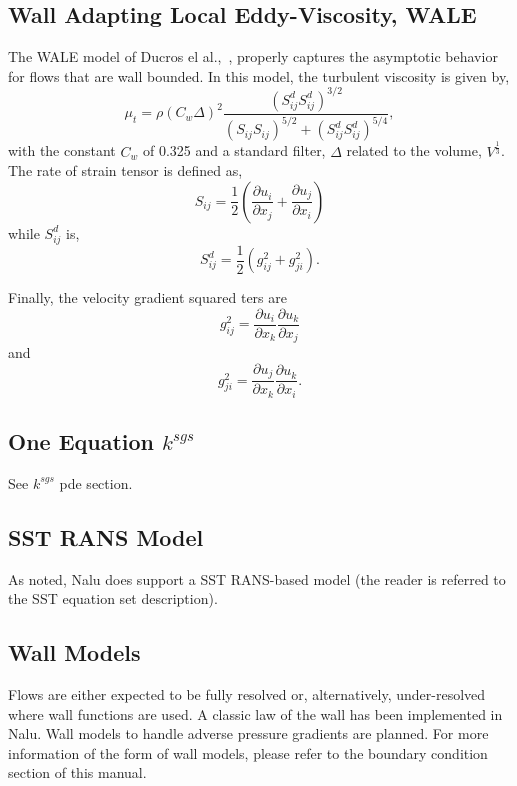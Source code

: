 \subsection{Wall Adapting Local Eddy-Viscosity, WALE}

The WALE model of Ducros el al.,~\cite{Ducros:1998}, properly captures the asymptotic
behavior for flows that are wall bounded. In this model, the turbulent viscosity is
given by,
%
\begin{equation}
\mu_t = \rho \left(C_w \Delta \right)^2 \frac{\left( S^d_{ij}S^d_{ij}\right)^{3/2}}{\left( S_{ij}S_{ij}\right)^{5/2} + \left( S^d_{ij}S^d_{ij}\right)^{5/4}},
\label{mut-wale}
\end{equation}
%
with the constant $C_w$ of 0.325 and a standard filter, $\Delta$ related to the volume, $V^{\frac{1}{3}}$. 
The rate of strain tensor is defined as,
\begin{equation}
S_{ij} = \frac{1}{2} \left( \frac{\partial u_i}{\partial x_j} + \frac{\partial u_j}{\partial x_i} \right)
\label{wale-sij}
\end{equation}
while $S^d_{ij}$ is,
\begin{equation}
 S^d_{ij} = \frac{1}{2} \left( g^2_{ij} + g^2_{ji}\right).
\label{wale-sij}
\end{equation}

Finally, the velocity gradient squared ters are
\begin{equation}
 g^2_{ij} = \frac{\partial u_i}{\partial x_k} \frac{\partial u_k}{\partial x_j}
\label{wale-sqij}
\end{equation}
and
\begin{equation}
 g^2_{ji} = \frac{\partial u_j}{\partial x_k} \frac{\partial u_k}{\partial x_i}.
\label{wale-gsqji}
\end{equation}

\subsection{One Equation $k^{sgs}$}
See $k^{sgs}$ pde section.

\subsection{SST RANS Model}
As noted, Nalu does support a SST RANS-based model (the reader is referred to the SST equation set description).

\subsection{Wall Models}
Flows are either expected to be fully resolved or, alternatively, under-resolved
where wall functions are used. A classic law of the wall has been implemented in Nalu. 
Wall models to handle adverse pressure gradients are planned. For more information of the form
of wall models, please refer to the boundary condition section of this manual.



